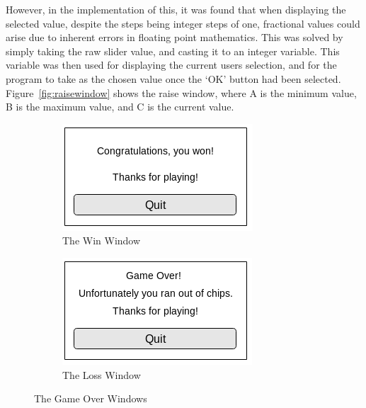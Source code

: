 However, in the implementation of this, it was found that when displaying
the selected value, despite the steps being integer steps of one, 
fractional values could arise due to inherent errors in floating point 
mathematics. This was solved by simply taking the raw slider value, and 
casting it to an integer variable. This variable was then used for displaying 
the current users selection, and for the program to take as the chosen value 
once the `OK' button had been selected. Figure~\ref{fig:raisewindow} shows the 
raise window, where A is the minimum value, B is the maximum value, and C is 
the current value.

\begin{figure}
    \centering
    \begin{subfigure}[h]{0.4\textwidth}
        \includegraphics[width=\textwidth]{../images/winscreen.png}
        \caption{The Win Window}%
        \label{fig:winwindow}
    \end{subfigure}
    \begin{subfigure}[h]{0.4\textwidth}
        \includegraphics[width=\textwidth]{../images/lossscreen.png}
        \caption{The Loss Window}%
        \label{fig:losswindow}
    \end{subfigure}
    \caption{The Game Over Windows}\label{fig:gameoverwindows}
\end{figure}


